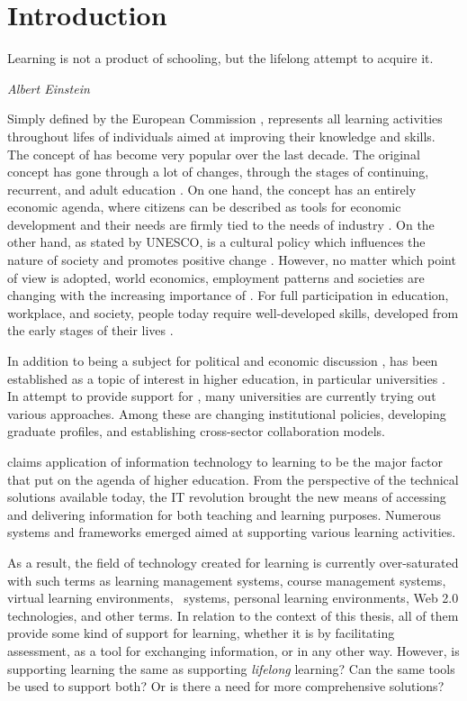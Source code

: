 \chapter{Introduction\label{cha:intro}}
\epigraph{Learning is not a product of schooling, but the lifelong attempt to
acquire it.}{\textit{Albert Einstein}}
\noindent

Simply defined by the European Commission \citeyearpar{EuropeanCommission2000},
\LLLs represents all learning activities throughout lifes of individuals aimed
at improving their knowledge and skills. The concept of \LLLs has become very
popular over the last decade. The original concept has gone through a lot of
changes, through the stages of continuing, recurrent, and adult education
\citep{Jarvis2004}. On one hand, the \LLLs concept has an entirely economic
agenda, where citizens can be described as tools for economic development and
their needs are firmly tied to the needs of industry
\citep[pp.~112-114]{Carter2008}. On the other hand, as stated by UNESCO, \LLLs
is a cultural policy which influences the nature of society and promotes
positive change \citep[pp.~12-14]{Boshier2000}. However, no matter which point
of view is adopted, world economics, employment patterns and societies are
changing with the increasing importance of \LLLs
\citep{Jarvis2008,Simmons-McDonald2009}. For full participation in education,
workplace, and society, people today require well-developed \LLLs skills,
developed from the early stages of their lives \citep{Otala1997}.

In addition to being a subject for political and economic discussion
\citep{Bagnall2009}, \LLLs has been established as a topic of interest in
higher education, in particular universities \citep{Knapper2000}. In attempt to
provide support for \LLLsn, many universities are currently trying out various
approaches. Among these are changing institutional policies, developing graduate
profiles, and establishing cross-sector collaboration models.

\citet{Duke2001} claims application of information technology to learning to be
the major factor that put \LLLs on the agenda of higher education. From the
perspective of the technical solutions available today, the IT revolution
brought the new means of accessing and delivering information for both teaching
and learning purposes. Numerous systems and frameworks emerged aimed at
supporting various learning activities. 

As a result, the field of technology created for learning is currently
over-saturated with such terms as learning management systems, course management
systems, virtual learning environments, \ep~systems, personal learning
environments, Web 2.0 technologies, and other terms. In relation to the context
of this thesis, all of them provide some kind of support for learning, whether
it is by facilitating assessment, as a tool for exchanging information, or in
any other way. However, is supporting learning the same as supporting
\textit{lifelong} learning? Can the same tools be used to support both? Or is
there a need for more comprehensive solutions?

